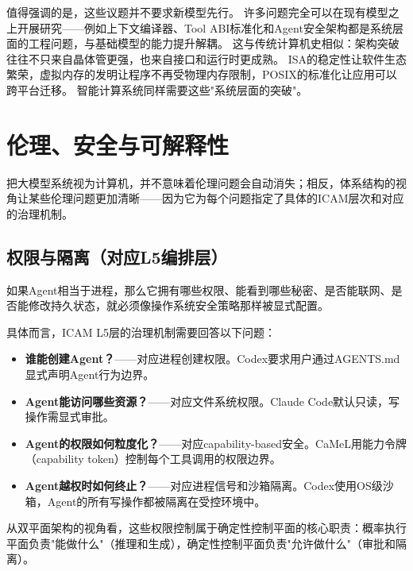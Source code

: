 值得强调的是，这些议题并不要求新模型先行。
许多问题完全可以在现有模型之上开展研究——例如上下文编译器、Tool ABI标准化和Agent安全架构都是系统层面的工程问题，与基础模型的能力提升解耦。
这与传统计算机史相似：架构突破往往不只来自晶体管更强，也来自接口和运行时更成熟。
ISA的稳定性让软件生态繁荣，虚拟内存的发明让程序不再受物理内存限制，POSIX的标准化让应用可以跨平台迁移。
智能计算系统同样需要这些"系统层面的突破"。

\section{伦理、安全与可解释性}
\label{sec:ethics}

把大模型系统视为计算机，并不意味着伦理问题会自动消失；相反，体系结构的视角让某些伦理问题更加清晰——因为它为每个问题指定了具体的ICAM层次和对应的治理机制。

\subsection{权限与隔离（对应L5编排层）}

如果Agent相当于进程，那么它拥有哪些权限、能看到哪些秘密、是否能联网、是否能修改持久状态，就必须像操作系统安全策略那样被显式配置\cite{openai_codex_approvals_2026,openai_codex_sandbox_2026,anthropic_claudecode_security_2026,anthropic_claudecode_sandbox_2026,debenedetti2025camel,ironclaw2025}。

具体而言，ICAM L5层的治理机制需要回答以下问题：
\begin{itemize}[nosep]
\item \textbf{谁能创建Agent？}——对应进程创建权限。Codex要求用户通过AGENTS.md显式声明Agent行为边界\cite{openai_codex_agents_md_2026}。
\item \textbf{Agent能访问哪些资源？}——对应文件系统权限。Claude Code默认只读，写操作需显式审批\cite{anthropic_claudecode_security_2026}。
\item \textbf{Agent的权限如何粒度化？}——对应capability-based安全。CaMeL用能力令牌（capability token）控制每个工具调用的权限边界\cite{debenedetti2025camel}。
\item \textbf{Agent越权时如何终止？}——对应进程信号和沙箱隔离。Codex使用OS级沙箱，Agent的所有写操作都被隔离在受控环境中\cite{openai_codex_sandbox_2026}。
\end{itemize}

从双平面架构的视角看，这些权限控制属于确定性控制平面的核心职责：概率执行平面负责"能做什么"（推理和生成），确定性控制平面负责"允许做什么"（审批和隔离）。


